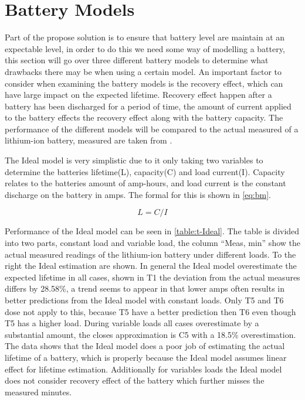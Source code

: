 \section{Battery Models} \label{sec:kibam}
Part of the propose solution is to ensure that battery level are maintain at an expectable level, in order to do this we need some way of modelling a battery, this section will go over three different battery models to determine what drawbacks there may be when using a certain model. An important factor to consider when examining the battery models is the recovery effect, which can have large impact on the expected lifetime. Recovery effect happen after a battery has been discharged for a period of time, the amount of current applied to the battery effects the recovery effect along with the battery capacity. The performance of the different models will be compared to the actual measured of a lithium-ion battery, measured are taken from \cite{battery_lifetime_analysis}.

The Ideal model is very simplistic due to it only taking two variables to determine the batteries lifetime(L), capacity(C) and load current(I). Capacity relates to the batteries amount of amp-hours, and load current is the constant discharge on the battery in amps. The formal for this is shown in \cref{eq:bm}.

\begin{equation}\label{eq:bm}
L=C/I
\end{equation}

Performance of the Ideal model can be seen in \cref{table:t-Ideal}. The table is divided into two parts, constant load and variable load, the column ``Meas, min'' show the actual measured readings of the lithium-ion battery under different loads. To the right the Ideal estimation are shown. In general the Ideal model overestimate the expected lifetime in all cases, shown in T1 the deviation from the actual measures differs by 28.58\%, a trend seems to appear in that lower amps often results in better predictions from the Ideal model with constant loads. Only T5 and T6 dose not apply to this, because T5 have a better prediction then T6 even though T5 has a higher load. During variable loads all cases overestimate by a substantial amount, the closes approximation is C5 with a 18.5\% overestimation. The data shows that the Ideal model does a poor job of estimating the actual lifetime of a battery, which is properly because the Ideal model assumes linear effect for lifetime estimation. Additionally for variables loads the Ideal model does not consider recovery effect of the battery which further misses the measured minutes. 

